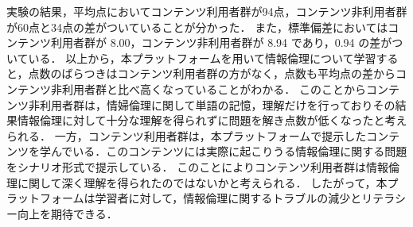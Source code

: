 実験の結果，平均点においてコンテンツ利用者群が94点，コンテンツ非利用者群が60点と34点の差がついていることが分かった．
また，標準偏差においてはコンテンツ利用者群が 8.00，コンテンツ非利用者群が 8.94 であり，0.94 の差がついている．
以上から，本プラットフォームを用いて情報倫理について学習すると，点数のばらつきはコンテンツ利用者群の方がなく，点数も平均点の差からコンテンツ非利用者群と比べ高くなっていることがわかる．
このことからコンテンツ非利用者群は，情婦倫理に関して単語の記憶，理解だけを行っておりその結果情報倫理に対して十分な理解を得られずに問題を解き点数が低くなったと考えられる．
一方，コンテンツ利用者群は，本プラットフォームで提示したコンテンツを学んでいる．このコンテンツには実際に起こりうる情報倫理に関する問題をシナリオ形式で提示している．
このことによりコンテンツ利用者群は情報倫理に関して深く理解を得られたのではないかと考えられる．
したがって，本プラットフォームは学習者に対して，情報倫理に関するトラブルの減少とリテラシー向上を期待できる．
